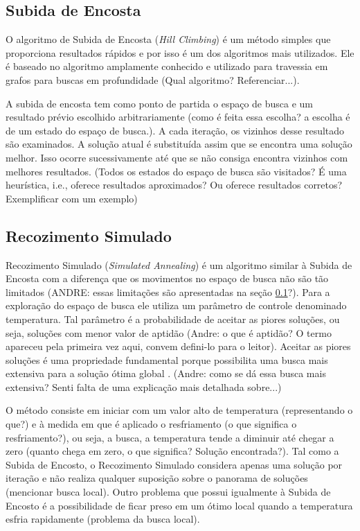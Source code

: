 \subsection{Subida de Encosta}
\label{sec:subidaDeEncosta}

O algoritmo de Subida de Encosta (\textit{Hill Climbing}) é um método simples que proporciona resultados rápidos e por isso é um dos algoritmos mais utilizados. Ele é baseado no algoritmo amplamente conhecido e utilizado para travessia em grafos para buscas em profundidade (Qual algoritmo?  Referenciar...). 

A subida de encosta tem como ponto de partida o espaço de busca e um resultado prévio escolhido arbitrariamente (como é feita essa escolha? a escolha é de um estado do espaço de busca.). A cada iteração, os vizinhos desse resultado são examinados. A solução atual é substituída assim que se encontra uma solução melhor. Isso ocorre sucessivamente até que se não consiga encontra vizinhos com melhores resultados.  (Todos os estados do espaço de busca são visitados? É uma heurística, i.e., oferece resultados aproximados? Ou oferece resultados corretos? Exemplificar com um exemplo) 

\subsection{Recozimento Simulado}

Recozimento Simulado (\textit{Simulated Annealing}) é um algoritmo similar à Subida de Encosta com a diferença que os movimentos no espaço de busca não são tão limitados (ANDRE: essas limitações são apresentadas na seção \ref{sec:subidaDeEncosta}?). Para a exploração do espaço de busca ele utiliza um parâmetro de controle denominado temperatura. Tal parâmetro é a probabilidade de aceitar as piores soluções, ou seja, soluções com menor valor de aptidão (Andre: o que é aptidão? O termo apareceu pela primeira vez aqui, convem defini-lo para o leitor).  Aceitar as piores soluções é uma propriedade fundamental porque possibilita uma busca mais extensiva para a solução ótima global \cite{kirkpatrick1983optimization}. (Andre: como se dá essa busca mais extensiva? Senti falta de uma explicação mais detalhada sobre...)

O método consiste em iniciar com um valor alto de temperatura (representando o que?) e à medida em que é aplicado o resfriamento (o que significa o resfriamento?), ou seja, a busca, a temperatura tende a diminuir até chegar a zero (quanto chega em zero, o que significa? Solução encontrada?). Tal como a Subida de Encosto, o Recozimento Simulado considera apenas uma solução por iteração e não realiza qualquer suposição sobre o panorama de soluções (mencionar busca local). Outro problema que possui igualmente à Subida de Encosto é a possibilidade de ficar preso em um ótimo local quando a temperatura esfria rapidamente (problema da busca local).

